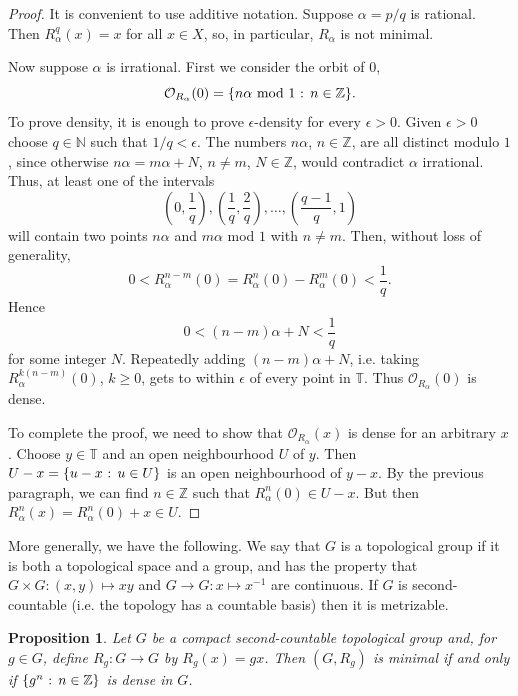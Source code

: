 \documentclass[12pt]{article}
\newtheorem{proposition}[theorem]{Proposition}
\theoremstyle{definition}
\theoremstyle{remark}
\begin{document}
\begin{proof} It is convenient to use additive notation.
Suppose $\alpha = p/q$ is rational. Then $R_\alpha^q(x)=x$ for all $x\in X$, so, in particular, $R_\alpha$ is not
minimal.

Now suppose $\alpha$ is irrational. 
First we consider the orbit of $0$,
\[
\mathcal O_{R_\alpha}(0) = \{n\alpha \ \text{mod} \ 1 \hbox{ : } n \in \mathbb Z\}.
\]
To prove density, it is enough to prove $\epsilon$-density for every $\epsilon>0$.
Given $\epsilon>0$ choose $q \in \mathbb N$ such that $1/q < \epsilon$.
The numbers
$n\alpha$, $n \in \mathbb Z$, are all distinct modulo $1$, since otherwise
$n\alpha = m\alpha + N$, $n \ne m$, $N \in \mathbb Z$, would contradict $\alpha$ irrational.
Thus, at least one of the intervals
\[
\left(0,\frac{1}{q}\right), \left(\frac{1}{q},\frac{2}{q}\right), \ldots, \left(\frac{q-1}{q},1\right)
\]
will contain two points 
$n\alpha$ and $m\alpha$ mod $1$
with $n \ne m$. Then, without loss of generality,
\[
0 < R_\alpha^{n-m}(0) = R_\alpha^n(0) - R_\alpha^m(0) < \frac{1}{q}.
\]
Hence
\[
0 < (n-m)\alpha + N < \frac{1}{q}
\]
for some integer $N$. Repeatedly adding $(n-m)\alpha + N$, i.e. taking
$R_\alpha^{k(n-m)}(0)$, $k \ge 0$, gets to within $\epsilon$ of every point in 
$\mathbb T$. Thus $\mathcal O_{R_\alpha}(0)$ is dense.

To complete the proof, we need to show that $\mathcal O_{R_\alpha}(x)$ is dense for an arbitrary $x$.
Choose $y \in \mathbb T$ and an open neighbourhood $U$ of $y$. Then $U-x = \{u-x \hbox{ : } u\in U\}$
is an open neighbourhood of $y-x$.
By the previous paragraph, we can find $n \in \mathbb Z$ such that
$R_\alpha^n(0) \in U-x$. But then $R_\alpha^n(x) = R_\alpha^n(0)+x \in U$.
\end{proof}

More generally, we have the following. We say that $G$ is a topological group if it is both a
topological space and a group, and has the property that $G \times G : (x,y) \mapsto xy$ and $G \to G : x \mapsto x^{-1}$ are
continuous. If $G$ is second-countable (i.e. the topology has a countable basis)
then it is metrizable.

\begin{proposition}
Let $G$ be a compact second-countable topological group and, for $g \in G$, define $R_g : G \to G$ by
$R_g(x) = gx$. Then $(G,R_g)$ is minimal if and only if 
$\{g^n \hbox{ : } n \in \mathbb Z\}$ is dense in $G$. 
\end{proposition}
\end{document}
